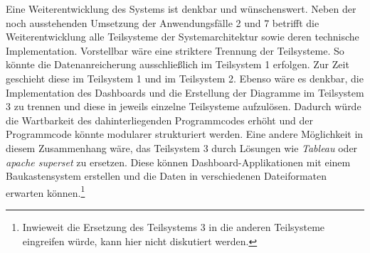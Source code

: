 



Eine Weiterentwicklung des Systems ist denkbar und wünschenswert. 
Neben der noch ausstehenden Umsetzung der Anwendungsfälle 2 und 7 betrifft die Weiterentwicklung alle Teilsysteme der Systemarchitektur
sowie deren technische Implementation. Vorstellbar wäre eine striktere Trennung der Teilsysteme. 
So könnte die Datenanreicherung ausschließlich im Teilsystem 1 erfolgen. Zur Zeit geschieht diese im Teilsystem 1 und im Teilsystem 2. 
Ebenso wäre es denkbar, die Implementation des Dashboards und die Erstellung der Diagramme im Teilsystem 3 zu trennen und diese in jeweils einzelne Teilsysteme
aufzulösen. Dadurch würde die Wartbarkeit des dahinterliegenden Programmcodes erhöht und der Programmcode könnte modularer strukturiert werden.
Eine andere Möglichkeit in diesem Zusammenhang wäre, das Teilsystem 3 durch Lösungen wie \textit{Tableau} oder \textit{apache superset} zu ersetzen.
Diese können Dashboard-Applikationen mit einem Baukastensystem erstellen und die Daten in verschiedenen Dateiformaten erwarten können.\footnote{ Inwieweit die Ersetzung des Teilsystems 3 in die anderen Teilsysteme eingreifen würde, kann
hier nicht diskutiert werden.}

